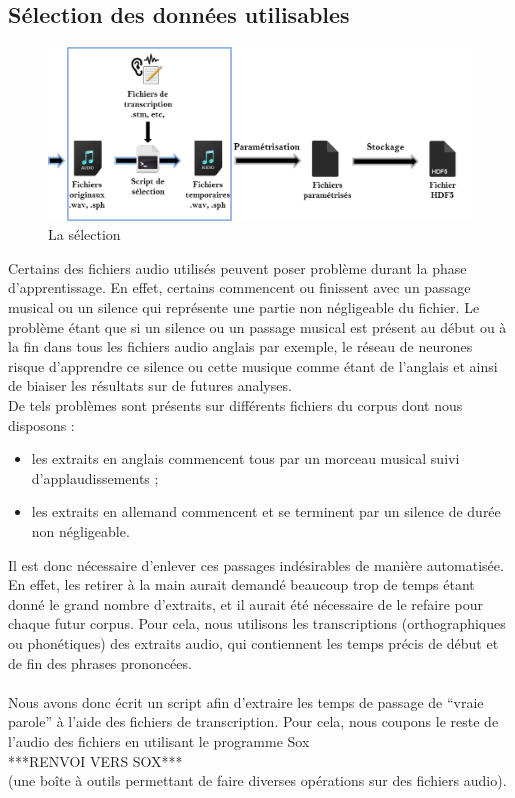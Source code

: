 \documentclass{article}
\begin{document}
\subsection{Sélection des données utilisables}

\newpage

\hphantom{.}
\begin{figure}[h]
  \centerline{\includegraphics[scale=0.8]{img/schema_selection.png}}
  \caption{La sélection}
\end{figure}

Certains des fichiers audio utilisés peuvent poser problème durant la phase d'apprentissage. En effet, certains commencent ou finissent avec un passage musical ou un silence qui représente une partie non négligeable du fichier. Le problème étant que si un silence ou un passage musical est présent au début ou à la fin dans tous les fichiers audio anglais par exemple, le réseau de neurones risque d'apprendre ce silence ou cette musique comme étant de l'anglais et ainsi de biaiser les résultats sur de futures analyses.\\
\noindent De tels problèmes sont présents sur différents fichiers du corpus dont nous disposons :
\begin{itemize}
    \item les extraits en anglais commencent tous par un morceau musical suivi d'applaudissements ;

    \item les extraits en allemand commencent et se terminent par un silence de durée non négligeable.
    \end{itemize}
    
\noindent Il est donc nécessaire d'enlever ces passages indésirables de manière automatisée. En effet, les retirer à la main aurait demandé beaucoup trop de temps étant donné le grand nombre d'extraits, et il aurait été nécessaire de le refaire pour chaque futur corpus. Pour cela, nous utilisons les transcriptions (orthographiques ou phonétiques) des extraits audio, qui contiennent les temps précis de début et de fin des phrases prononcées.\\
 \\
 Nous avons donc écrit un script afin d'extraire les temps de passage de ``vraie parole'' à l'aide des fichiers de transcription. Pour cela, nous coupons le reste de l'audio des fichiers en utilisant le programme Sox \\
 ***RENVOI VERS SOX***\\(une boîte à outils permettant de faire diverses opérations sur des fichiers audio).
\end{document}
